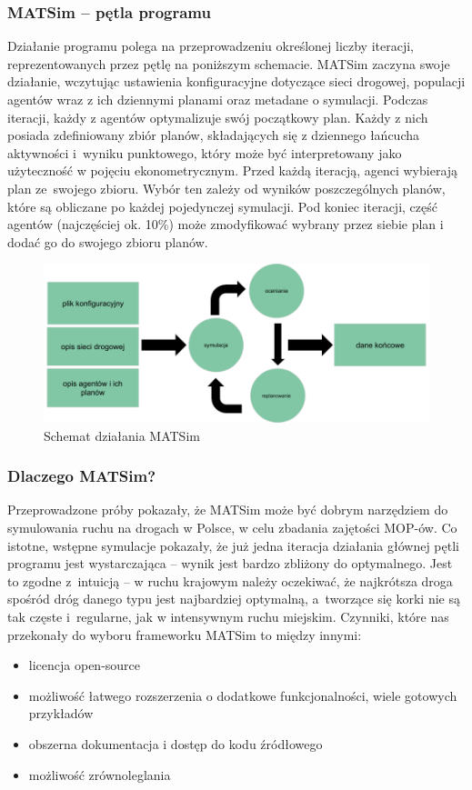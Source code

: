 \subsubsection{MATSim -- pętla programu}
Działanie programu polega na przeprowadzeniu określonej liczby iteracji, reprezentowanych przez pętlę na poniższym schemacie. MATSim zaczyna swoje działanie, wczytując ustawienia konfiguracyjne dotyczące sieci drogowej, populacji agentów wraz z ich dziennymi planami oraz metadane o symulacji. Podczas iteracji, każdy z agentów optymalizuje swój początkowy plan. Każdy z nich posiada zdefiniowany zbiór planów, składających się z dziennego łańcucha aktywności i~wyniku punktowego, który może być interpretowany jako użyteczność w pojęciu ekonometrycznym. Przed każdą iteracją, agenci wybierają plan ze~swojego zbioru. Wybór ten zależy od wyników poszczególnych planów, które są obliczane po każdej pojedynczej symulacji. Pod koniec iteracji, część agentów (najczęściej ok. 10\%) może zmodyfikować wybrany przez siebie plan i dodać go do swojego zbioru planów. 
    \begin{figure}[h]
        \caption{Schemat działania MATSim}
        \includegraphics[width=\textwidth]{images/matsim-workflow.png}
    \end{figure}
\newpage
\subsubsection{Dlaczego MATSim?}
Przeprowadzone próby pokazały, że MATSim może być dobrym narzędziem do symulowania ruchu na drogach w Polsce, w celu zbadania zajętości MOP-ów. Co istotne, wstępne symulacje pokazały, że już jedna iteracja działania głównej pętli programu jest wystarczająca -- wynik jest bardzo zbliżony do optymalnego. Jest to zgodne z~intuicją -- w ruchu krajowym należy oczekiwać, że najkrótsza droga spośród dróg danego typu jest najbardziej optymalną, a~tworzące się korki nie są tak częste i~regularne, jak w intensywnym ruchu miejskim. Czynniki, które nas przekonały do wyboru frameworku MATSim to między innymi:
\begin{itemize}
\item licencja open-source
\item możliwość łatwego rozszerzenia o dodatkowe funkcjonalności, wiele gotowych przykładów
\item obszerna dokumentacja i dostęp do kodu źródłowego
\item możliwość zrównoleglania
\end{itemize}

